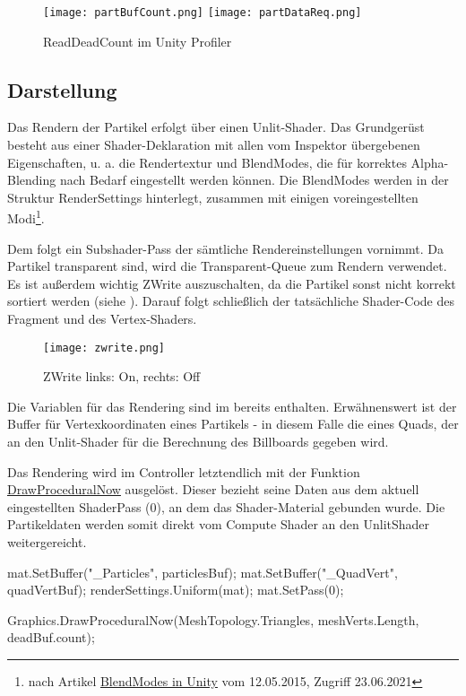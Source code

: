 \begin{figure}[H]
\centering
\texttt{[image: partBufCount.png]}
\texttt{[image: partDataReq.png]}
\caption{ReadDeadCount im Unity Profiler}
\end{figure}
    

\subsection{Darstellung}

Das Rendern der Partikel erfolgt über einen Unlit-Shader. Das Grundgerüst besteht aus einer Shader-Deklaration mit allen vom Inspektor übergebenen Eigenschaften, u. a. die Rendertextur und BlendModes, die für korrektes Alpha-Blending nach Bedarf eingestellt werden können. Die BlendModes werden in der Struktur RenderSettings hinterlegt, zusammen mit einigen voreingestellten Modi\footnote{nach Artikel \href{https://elringus.me/blend-modes-in-unity}{BlendModes in Unity} vom 12.05.2015, Zugriff 23.06.2021}.

Dem folgt ein Subshader-Pass der sämtliche Rendereinstellungen vornimmt. Da Partikel transparent sind, wird die Transparent-Queue zum Rendern verwendet. Es ist au{\ss}erdem wichtig ZWrite auszuschalten, da die Partikel sonst nicht korrekt sortiert werden (siehe ). Darauf folgt schlie{\ss}lich der tatsächliche Shader-Code des Fragment und des Vertex-Shaders.

\begin{figure}[H]
\centering
\texttt{[image: zwrite.png]}
\caption{ZWrite links: On, rechts: Off}
\label{img:zoff}
\end{figure}


Die Variablen für das Rendering sind im  bereits enthalten. Erwähnenswert ist der Buffer für Vertexkoordinaten eines Partikels - in diesem Falle die eines Quads, der an den Unlit-Shader für die Berechnung des Billboards gegeben wird.

Das Rendering wird im Controller letztendlich mit der Funktion \href{https://docs.unity3d.com/ScriptReference/Graphics.DrawProceduralNow.html}{DrawProceduralNow} ausgelöst. Dieser bezieht seine Daten aus dem aktuell eingestellten ShaderPass (0), an dem das Shader-Material gebunden wurde. Die Partikeldaten werden somit direkt vom Compute Shader an den UnlitShader weitergereicht.

\begin{csh}[caption=Partikel Rendering]
mat.SetBuffer("_Particles", particlesBuf);
mat.SetBuffer("_QuadVert", quadVertBuf);
renderSettings.Uniform(mat);
mat.SetPass(0);

Graphics.DrawProceduralNow(MeshTopology.Triangles, meshVerts.Length, deadBuf.count);
\end{csh}

